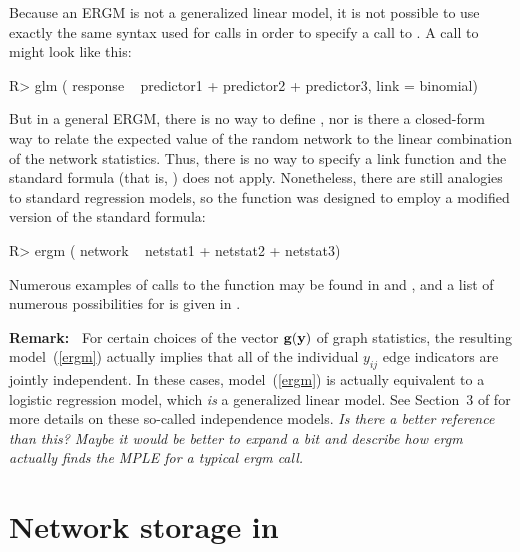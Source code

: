 \documentclass[article]{jss}
\def\vec#1{\mathchoice{\mbox{\boldmath$\displaystyle\bf#1$}}
{\mbox{\boldmath$\textstyle\bf#1$}}
{\mbox{\boldmath$\scriptstyle\bf#1$}}
{\mbox{\boldmath$\scriptscriptstyle\bf#1$}}}
\begin{document}
Because an ERGM is not a generalized linear model,
it is not possible to use exactly the same  syntax used for
 calls  in order to specify a call to .  
A call to  might look like this:
\begin{CodeChunk}
\begin{CodeInput} 
R> glm ( response ~ predictor1 + predictor2 + predictor3, link = binomial)
\end{CodeInput}
\end{CodeChunk}
But in a general ERGM, there
is no way to define ,
nor is there a closed-form way to relate the expected value of the random 
network to the linear combination of the network statistics.  Thus, there is
no way to specify a link function and the standard  formula
(that is, ) does not apply.  Nonetheless, there
are still analogies to standard regression models, so the
 function was designed to employ a modified version of the
standard  formula:
\begin{CodeChunk}
\begin{CodeInput} 
R> ergm ( network ~ netstat1 + netstat2 + netstat3)
\end{CodeInput}
\end{CodeChunk}
Numerous examples of calls to the  function may be found in 
\citet{ergmjss} and \citet{statnettutorialjss}, and a list of numerous possibilities
for  is given in \citet{ergmtermsjss}.

{\bf Remark:\ }
For certain choices of the vector $\vec g(\vec y)$ of graph statistics, the resulting
model~(\ref{ergm}) actually implies that all of the individual $y_{ij}$ edge indicators
are jointly independent.  In these cases, model~(\ref{ergm}) is actually equivalent
to a logistic regression model, which {\em is} a generalized linear model.
See Section~3 of \citet{HunGoodHan08} for more details on these so-called
independence models.
{\em Is there a better reference than this?  Maybe it would be better to expand a bit and
describe how ergm actually finds the MPLE for a typical ergm call.}


\section[Network storage in ergm]{Network storage in }
\end{document}
